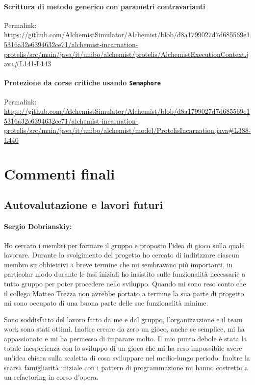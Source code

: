 \documentclass[a4paper,12pt]{report}
\begin{document}
\subsubsection{Scrittura di metodo generico con parametri contravarianti}

Permalink: \url{https://github.com/AlchemistSimulator/Alchemist/blob/d8a1799027d7d685569e15316a32e6394632ce71/alchemist-incarnation-protelis/src/main/java/it/unibo/alchemist/protelis/AlchemistExecutionContext.java#L141-L143}

\subsubsection{Protezione da corse critiche usando \texttt{Semaphore}}

Permalink: \url{https://github.com/AlchemistSimulator/Alchemist/blob/d8a1799027d7d685569e15316a32e6394632ce71/alchemist-incarnation-protelis/src/main/java/it/unibo/alchemist/model/ProtelisIncarnation.java#L388-L440}


\chapter{Commenti finali}

\section{Autovalutazione e lavori futuri}
\subsubsection*{Sergio Dobrianskiy:}

Ho  cercato i membri per formare il gruppo e proposto l'idea di gioco sulla quale lavorare.
Durante lo svolgimento del progetto ho cercato di indirizzare ciascun membro su obbiettivi a breve termine che mi sembravano più importanti, in particolar modo durante le fasi iniziali ho insistito sulle funzionalità necessarie a tutto gruppo per poter procedere nello sviluppo. 
Quando mi sono reso conto che il collega Matteo Trezza non avrebbe portato a termine la sua parte di progetto mi sono occupato di una buona parte delle sue funzionalità minime.

Sono soddisfatto del lavoro fatto da me e dal gruppo, l'organizzazione e il team work sono stati ottimi. Inoltre creare da zero un gioco, anche se semplice, mi ha appassionato e mi ha permesso di imparare molto.
Il mio punto debole è stata la totale inesperienza con lo sviluppo di un gioco che mi ha reso impossibile avere un'idea chiara sulla scaletta di cosa sviluppare nel medio-lungo periodo. Inoltre la scarsa famigliarità iniziale con i pattern di programmazione mi hanno costretto a un refactoring in corso d'opera. 
\end{document}
